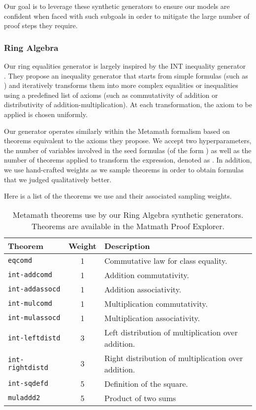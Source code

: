 \documentclass{article}
\begin{document}
Our goal is to leverage these synthetic generators to ensure our models are confident when faced with such subgoals in order to mitigate the large number of proof steps they require.

\subsubsection{Ring Algebra}

Our ring equalities generator is largely inspired by the INT inequality generator~\cite{wu2020int} . They propose an inequality generator that starts from simple formulas (such as ) and iteratively transforms them into more complex equalities or inequalities using a predefined list of axioms (such as commutativity of addition or distributivity of addition-multiplication). At each transformation, the axiom to be applied is chosen uniformly.

Our generator operates similarly within the Metamath formalism based on theorems equivalent to the axioms they propose. We accept two hyperparameters, the number of variables  involved in the seed formulas (of the form ) as well as the number of theorems applied to transform the expression, denoted as . In addition, we use hand-crafted weights as we sample theorems in order to obtain formulas that we judged qualitatively better.

Here is a list of the theorems we use and their associated sampling weights.

\begin{table}[ht]
\caption{Metamath theorems use by our Ring Algebra synthetic generators. Theorems are available in the Matmath Proof Explorer.}
\centering
\begin{tabular}{ |l|c|l| }
    \hline
    Theorem & Weight & Description \\
    \hline
    \verb|eqcomd| & 1 & Commutative law for class equality. \\
    \verb|int-addcomd| & 1 & Addition commutativity. \\
    \verb|int-addassocd| & 1 & Addition associativity. \\
    \verb|int-mulcomd| & 1 & Multiplication commutativity. \\
    \verb|int-mulassocd| & 1 & Multiplication associativity. \\
    \verb|int-leftdistd| & 3 & Left distribution of multiplication over addition. \\
    \verb|int-rightdistd| & 3 & Right distribution of multiplication over addition. \\
    \verb|int-sqdefd| & 5 & Definition of the square. \\
    \verb|muladdd2| & 5 & Product of two sums \\
    \hline
\end{tabular}
\label{table:theorems}
\end{table}
\end{document}
